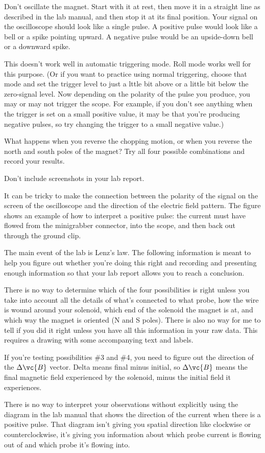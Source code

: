 Don't oscillate	the magnet. Start with it at rest, then	move it	in
a straight line	as described in	the lab	manual,	and then stop it at
its final position. Your signal	on the oscilloscope should look	like
a single pulse.	A positive pulse would look like a bell	or a spike
pointing upward. A negative pulse would	be an upside-down bell or
a downward spike.

This doesn't work well in automatic triggering mode. Roll mode works
well for this purpose. (Or if you want to practice using normal
triggering, choose that mode and set the trigger level to just a lttle
bit above or a little bit below the zero-signal level. Now depending
on the polarity of the pulse you produce, you may or may not trigger
the scope. For example, if you don't see anything when the trigger is
set on a small positive value, it may be that you're producing
negative pulses, so try changing the trigger to a small negative
value.)

What happens when you reverse the
chopping motion, or when you reverse the north and south
poles of the magnet? Try all four possible combinations and
record your results.

Don't include screenshots in your lab report.


It can be tricky to make the connection between the polarity
of the signal on the screen of the oscilloscope and the
direction of the electric field pattern. The figure shows an
example of how to interpret a positive pulse: the current
must have flowed from the minigrabber connector, into the
scope, and then back out through the ground clip.

\analysis

The main event of the lab is Lenz's law. The following information
is meant to help you figure out whether you're doing this right and
recording and presenting enough information so that your lab report
allows you to reach a conclusion.

There is no way to determine which of the four possibilities is right
unless you take into account all the details of what's connected to
what probe, how the wire is wound around your solenoid, which end of
the solenoid the magnet is at, and which way the magnet is oriented (N
and S poles). There is also no way for me to tell if you did it right
unless you have all this information in your raw data. This requires a
drawing with some accompanying text and labels.

If you're testing possibilities \#3 and \#4, you need to figure out the
direction of the $\Delta\vc{B}$ vector. Delta means final minus initial, so
$\Delta\vc{B}$ means the final magnetic field experienced by the solenoid, minus
the initial field it experiences.

There is no way	to interpret your observations without explicitly
using the diagram in the lab manual that shows the direction of the
current when there is a	positive pulse. That diagram isn't giving you
spatial	direction like clockwise or counterclockwise, it's giving you
information about which	probe current is flowing out of	and which
probe it's flowing into.

